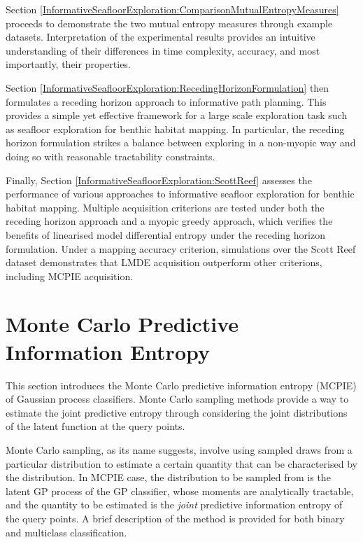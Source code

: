 	Section \ref{InformativeSeafloorExploration:ComparisonMutualEntropyMeasures} proceeds to demonstrate the two mutual entropy measures through example datasets. Interpretation of the experimental results provides an intuitive understanding of their differences in time complexity, accuracy, and most importantly, their properties.
	
	Section \ref{InformativeSeafloorExploration:RecedingHorizonFormulation} then formulates a receding horizon approach to informative path planning. This provides a simple yet effective framework for a large scale exploration task such as seafloor exploration for benthic habitat mapping. In particular, the receding horizon formulation strikes a balance between exploring in a non-myopic way and doing so with reasonable tractability constraints.
	
	Finally, Section \ref{InformativeSeafloorExploration:ScottReef} assesses the performance of various approaches to informative seafloor exploration for benthic habitat mapping. Multiple acquisition criterions are tested under both the receding horizon approach and a myopic greedy approach, which verifies the benefits of linearised model differential entropy under the receding horizon formulation. Under a mapping accuracy criterion, simulations over the Scott Reef dataset demonstrates that LMDE acquisition outperform other criterions, including MCPIE acquisition.
		
	\section{Monte Carlo Predictive Information Entropy}
	\label{InformativeSeafloorExploration:MCPIE}
	
		This section introduces the Monte Carlo predictive information entropy (MCPIE) of Gaussian process classifiers. Monte Carlo sampling methods provide a way to estimate the joint predictive entropy through considering the joint distributions of the latent function at the query points.
	
		Monte Carlo sampling, as its name suggests, involve using sampled draws from a particular distribution to estimate a certain quantity that can be characterised by the distribution. In MCPIE case, the distribution to be sampled from is the latent GP process of the GP classifier, whose moments are analytically tractable, and the quantity to be estimated is the \textit{joint} predictive information entropy of the query points. A brief description of the method is provided for both binary and multiclass classification.
		
